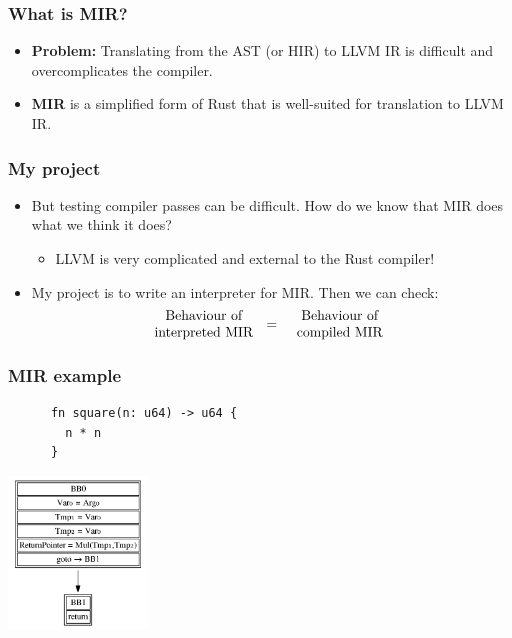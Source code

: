 \documentclass{beamer}
\begin{document}
\begin{frame}
  \frametitle{What is MIR?}

  \begin{itemize}
    \item \textbf{Problem:} Translating from the AST (or HIR) to LLVM IR is
      difficult and overcomplicates the compiler.

    \item \textbf{MIR} is a simplified form of Rust that is well-suited for
      translation to LLVM IR.
  \end{itemize}
\end{frame}

\begin{frame}
  \frametitle{My project}

  \begin{itemize}
    \item But testing compiler passes can be difficult. How do we know that MIR
      does what we think it does?

      \begin{itemize}
        \item LLVM is very complicated and external to the Rust compiler!
      \end{itemize}
      \pause

    \item My project is to write an interpreter for MIR. Then we can check:
      \begin{equation*}
        \text{\parbox{3cm}{\centering Behaviour of\\ interpreted MIR}}
        =
        \text{\parbox{3cm}{\centering Behaviour of\\ compiled MIR}}
      \end{equation*}
  \end{itemize}
\end{frame}

\begin{frame}[fragile]
  \frametitle{MIR example}

  \begin{center}
    \begin{verbatim}
      fn square(n: u64) -> u64 {
        n * n
      }
    \end{verbatim}

    \includegraphics[width=140px]{mir-sample.png}
  \end{center}
\end{frame}
\end{document}
